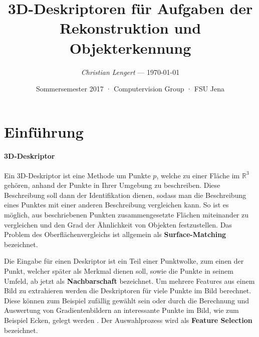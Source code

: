 \documentclass[12pt]{article}
\newcommand\svthema{3D-Deskriptoren für Aufgaben der Rekonstruktion und Objekterkennung}
\newcommand\svperson{Christian Lengert}
\newcommand\svdatum{\today}
\newcommand\lvtyp{Sommersemester 2017}
\newcommand\lvinst{Computervision Group · FSU Jena}
\begin{document}
\title{ \textbf{\color{black}\svthema} }
\author{ \textsl{\color{red}\svperson} --- \svdatum }
\date{ \small  {\lvtyp} · {\lvinst} }
\maketitle


\section{Einführung}\label{intro}
\paragraph{3D-Deskriptor}
Ein 3D-Deskriptor ist eine Methode um Punkte $p$, welche zu einer Fläche im $\mathbb{R}^3$ gehören, anhand der Punkte in Ihrer Umgebung zu beschreiben. Diese Beschreibung soll dann der Identifikation dienen, sodass man die Beschreibung eines Punktes mit einer anderen Beschreibung vergleichen kann. So ist es möglich, aus beschriebenen Punkten zusammengesetzte Flächen miteinander zu vergleichen und den Grad der Ähnlichkeit von Objekten festzustellen. Das Problem des Oberflächenvergleichs ist allgemein als \textbf{Surface-Matching} bezeichnet. 



Die Eingabe für einen Deskriptor ist ein Teil einer Punktwolke, zum einen der Punkt, welcher später als Merkmal dienen soll, sowie die Punkte in seinem Umfeld, ab jetzt als \textbf{Nachbarschaft} bezeichnet.
Um mehrere Features aus einem Bild zu extrahieren werden die Deskriptoren für viele Punkte im Bild berechnet. Diese können zum Beispiel zufällig gewählt sein \cite{SD} oder durch die Berechnung und Auswertung von Gradientenbildern an interessante Punkte im Bild, wie zum Beispiel Ecken, gelegt werden \cite{harris}. Der Auswahlprozess wird als \textbf{Feature Selection} bezeichnet. 
\end{document}
